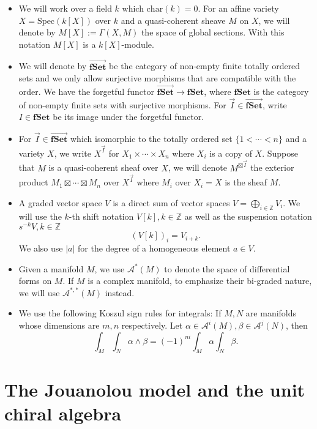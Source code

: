 \documentclass[11pt]{amsart}
\theoremstyle{definition}
\theoremstyle{remark}
\numberwithin{equation}{section}
\begin{document}
\begin{itemize}

\item We will work over a field $k$ which $\mathrm{char}(k)=0$. For an affine variety $X=\mathrm{Spec}(k[X])$ over $k$ and a quasi-coherent sheave $M$ on $X$, we will denote by $M[X]:=\Gamma(X,M)$ the space of global sections. With this notation $M[X]$ is a $k[X]$-module.



\item We will denote by $\overrightarrow{\mathbf{fSet}}$ be the category of non-empty finite totally ordered sets and we only allow surjective morphisms that are compatible with the order. We have the forgetful functor $\overrightarrow{\mathbf{fSet}}\rightarrow \mathbf{fSet}$, where $\mathbf{fSet}$ is the category of non-empty finite sets with surjective morphisms. For $\vec{I}\in \overrightarrow{\mathbf{fSet}}$, write $I\in \mathbf{fSet}$ be its image under the forgetful functor.
\item For $\vec{I}\in \overrightarrow{\mathbf{fSet}}$ which isomorphic to the totally ordered set $\{1<\cdots<n\}$ and a variety $X$, we write $X^{\vec{I}}$ for $X_1\times \cdots \times X_n$ where $X_i$ is a copy of $X$. Suppose that $M$ is a quasi-coherent sheaf over $X$, we will denote $M^{\boxtimes\vec{I}}$ the exterior product $M_1\boxtimes \cdots \boxtimes M_n$ over $X^{\vec{I}}$ where $M_i$ over $X_i=X$ is the sheaf $M$.
\item A graded vector space $V$ is a direct sum of vector spaces $V=\mathop{\bigoplus}\limits_{i\in\mathbb{Z}}V_i$. We will use the $k$-th shift notation $V[k],k\in \mathbb{Z}$ as well as the suspension notation $s^{-k}V,k\in\mathbb{Z}$
$$
(V[k])_i=V_{i+k}.$$
We also use $|a|$ for the degree of a homogeneous element $a\in V.$
\item Given a manifold $M$, we use $\mathcal{A}^{*}(M)$ to denote the space
    of differential forms on $M$. If $M$ is a
    complex manifold, to emphasize their bi-graded nature, we will use
    $\mathcal{A}^{*, *} (M)$ instead.
\item We use the following Koszul sign rules for integrals: If $M, N$ are manifolds whose dimensions are $m, n$ respectively. Let $\alpha \in \mathcal{A}^{i}(M),     \beta \in \mathcal{A}^{j}(N)$, then 
$$
\int_M \int_N \alpha \wedge\beta = (- 1)^{n i} \int_M \alpha \int_N \beta . 
$$
\end{itemize}
\section{The Jouanolou model and the unit chiral algebra}
\end{document}
